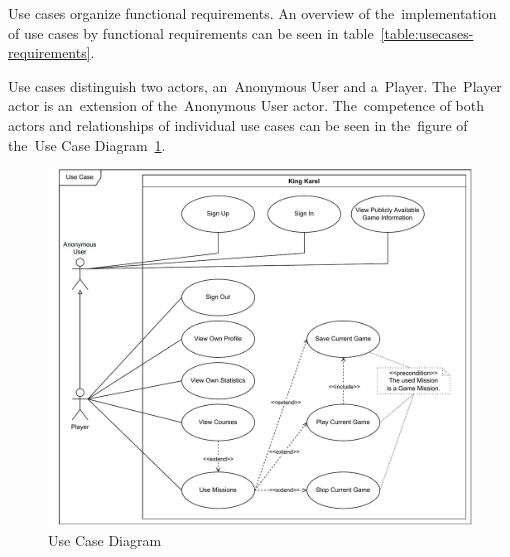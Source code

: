 Use cases organize functional requirements. 
An overview of the~implementation of use cases by functional requirements can be seen in table~\ref{table:usecases-requirements}.

Use cases distinguish two actors, an~Anonymous User and a~Player.
The~Player actor is an~extension of the~Anonymous User actor.
The~competence of both actors and relationships of individual use cases can be seen in the~figure of the~Use Case Diagram~\ref{fig:usecasediagram}.

\begin{figure}
    \centering
    \includegraphics[width=1\linewidth]{assets/design/usecasediagram.pdf}
    \caption{Use Case Diagram}
    \label{fig:usecasediagram}
\end{figure}
